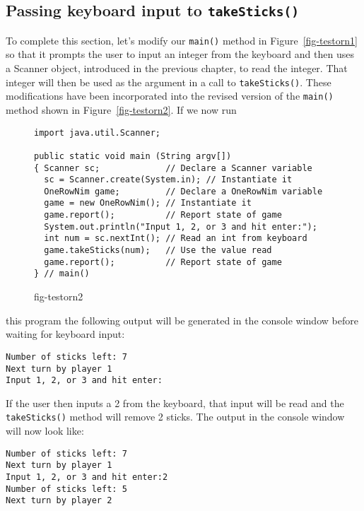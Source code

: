 \subsection{Passing keyboard input to {\tt takeSticks()}}

\noindent To complete this section, let's modify our {\tt main()} method
in Figure~\ref{fig-testorn1} so that it prompts the user to input an
integer from the keyboard and then uses a Scanner object, introduced
in the previous chapter, to read the integer. That integer will then
be used as the argument in a call to {\tt takeSticks()}. These
modifications have been incorporated into the revised version of the
{\tt main()} method shown in Figure~\ref{fig-testorn2}.  If we now run
\begin{figure}[h!]
\jjjprogstart
\begin{jjjlisting}
\begin{lstlisting}
import java.util.Scanner;
    
public static void main (String argv[])
{ Scanner sc;             // Declare a Scanner variable
  sc = Scanner.create(System.in); // Instantiate it
  OneRowNim game;         // Declare a OneRowNim variable
  game = new OneRowNim(); // Instantiate it
  game.report();          // Report state of game
  System.out.println("Input 1, 2, or 3 and hit enter:");
  int num = sc.nextInt(); // Read an int from keyboard
  game.takeSticks(num);   // Use the value read
  game.report();          // Report state of game
} // main()
\end{lstlisting}
\end{jjjlisting}
{fig-testorn2}
\end{figure}
this program the following output will be generated in the console
window before waiting for keyboard input:

\begin{jjjlisting}
\begin{lstlisting}
Number of sticks left: 7
Next turn by player 1
Input 1, 2, or 3 and hit enter:
\end{lstlisting}
\end{jjjlisting}

\noindent If the user then inputs a 2 from the keyboard, that input
will be read and the {\tt takeSticks()} method will remove 2 sticks.
The output in the console window will now look like:

\begin{jjjlisting}
\begin{lstlisting}
Number of sticks left: 7
Next turn by player 1
Input 1, 2, or 3 and hit enter:2
Number of sticks left: 5
Next turn by player 2
\end{lstlisting}
\end{jjjlisting}

